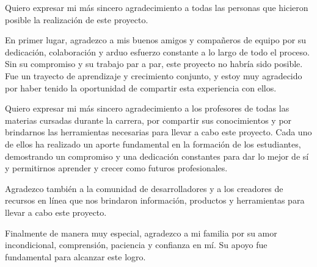 Quiero expresar mi más sincero agradecimiento a todas las personas que hicieron posible la realización de este proyecto.

En primer lugar, agradezco a mis buenos amigos y compañeros de equipo por su dedicación, colaboración y arduo esfuerzo constante 
a lo largo de todo el proceso. Sin su compromiso y su trabajo par a par, este proyecto no habría sido posible.
Fue un trayecto de aprendizaje y crecimiento conjunto, y estoy muy agradecido por haber tenido la oportunidad de compartir 
esta experiencia con ellos.

Quiero expresar mi más sincero agradecimiento a los profesores de todas las materias cursadas durante la carrera, 
por compartir sus conocimientos y por brindarnos las herramientas necesarias para llevar a cabo este proyecto.
Cada uno de ellos ha realizado un aporte fundamental en la formación de los estudiantes, demostrando un compromiso 
y una dedicación constantes para dar lo mejor de sí y permitirnos aprender y crecer como futuros profesionales.

Agradezco también a la comunidad de desarrolladores y a los creadores de recursos en línea que nos brindaron información, 
productos y herramientas para llevar a cabo este proyecto.

Finalmente de manera muy especial, agradezco a mi familia por su amor incondicional, comprensión, paciencia y 
confianza en mí. Su apoyo fue fundamental para alcanzar este logro.